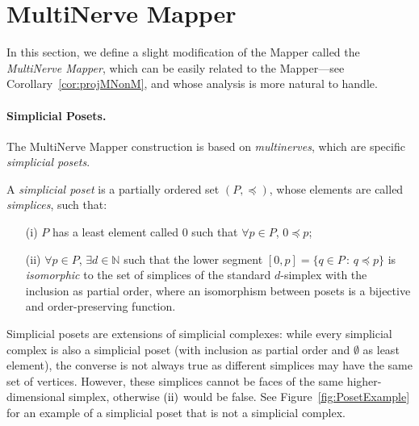 \section{MultiNerve Mapper}
\label{sec:MultiNerveMapper}

In this section, we define a slight modification of the Mapper called the {\em MultiNerve Mapper},
which can be easily related to the Mapper---see Corollary~\ref{cor:projMNonM}, and whose analysis is more natural to handle. 


\paragraph*{Simplicial Posets.}
The MultiNerve Mapper construction is based on {\em multinerves}, which are specific {\em simplicial posets}.

\begin{defin}
A \emph{simplicial poset} is a partially ordered set $(P,\preceq)$, whose elements are called \emph{simplices}, such that:

\begin{itemize}
\item[\rm (i)] $P$ has a least element called $0$ such that $\forall p\in P$, $0\preceq p$;
\item[\rm (ii)] $\forall p\in P$, $\exists d\in\mathbb{N}$ such that the lower segment 
$[0,p]=\{q\in P\,:\,q\preceq p\}$ is \emph{isomorphic} to the
set of simplices of the standard $d$-simplex with the inclusion as partial order,
where an isomorphism between posets is a bijective and order-preserving function.
\end{itemize}
\end{defin}

Simplicial posets are extensions of simplicial complexes: while every
simplicial complex is also a simplicial poset (with inclusion as
partial order and $\emptyset$ as least element), the converse is not
always true as different simplices may have the same set of vertices.
However, these simplices cannot be faces of the same
higher-dimensional simplex, otherwise $\rm (ii)$ would be false. See
Figure~\ref{fig:PosetExample} for an example of a simplicial poset
that is not a simplicial complex.

